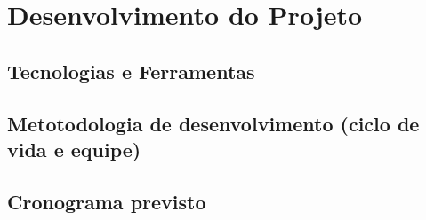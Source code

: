 \chapter{Desenvolvimento do Projeto}

\section{Tecnologias e Ferramentas}

\section{Metotodologia de desenvolvimento (ciclo de vida e equipe)}

\section{Cronograma previsto}
